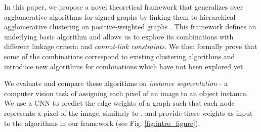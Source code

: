 
In this paper, we propose a novel theoretical framework that generalizes over agglomerative algorithms for signed graphs by linking them to hierarchical agglomerative clustering on positive-weighted graphs \cite{lance1967general}. This framework defines an underlying basic algorithm and allows us to explore its combinations with different linkage criteria and \emph{cannot-link constraints}. %
We then formally prove that some of the combinations correspond to existing clustering algorithms and introduce new algorithms for combinations which have not been explored yet. %

We evaluate and compare these algorithms on \emph{instance segmentation} - a computer vision task of assigning each pixel of an image to an object instance. %
We use a CNN to predict the edge weights of a graph such that each node represents a pixel of the image, similarly to \cite{liu2018affinity,lee2017superhuman,wolf2018mutex}, and provide these weights as input to the algorithms in our framework (see Fig. \ref{fig:intro_figure}). 


